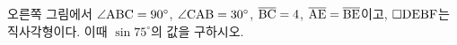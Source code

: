 \noindent\begin{minipage}[t]{0.58\linewidth}\vspace{0pt}\raggedright 오른쪽 그림에서 $\angle\mathrm{ABC}=90^\circ$, $\angle\mathrm{CAB}=30^\circ$, $\overline{\mathrm{BC}}=4$, $\overline{\mathrm{AE}}=\overline{\mathrm{BE}}$이고, $\square\mathrm{DEBF}$는 직사각형이다. 이때 $\sin 75^\circ$의 값을 구하시오. \end{minipage}\hfill\begin{minipage}[t]{0.4\linewidth}\vspace{0pt}\centering \resizebox{\ifdim\width>\linewidth\linewidth\else\width\fi}{!}{}\end{minipage}\par
